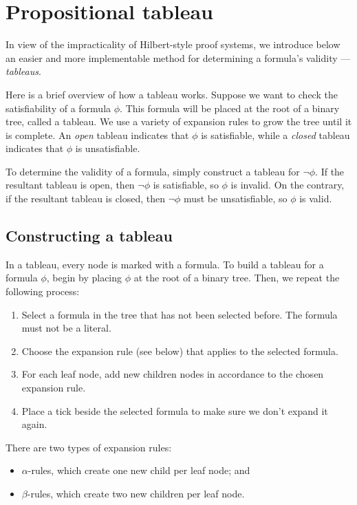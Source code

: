 \section{Propositional tableau}

In view of the impracticality of Hilbert-style proof systems, we introduce below an easier and more implementable method for determining a formula's validity --- \emph{tableaus}.

Here is a brief overview of how a tableau works. Suppose we want to check the satisfiability of a formula \(\phi\). This formula will be placed at the root of a binary tree, called a tableau. We use a variety of expansion rules to grow the tree until it is complete. An \emph{open} tableau indicates that \(\phi\) is satisfiable, while a \emph{closed} tableau indicates that \(\phi\) is unsatisfiable.

To determine the validity of a formula, simply construct a tableau for \(\neg\phi\). If the resultant tableau is open, then \(\neg\phi\) is satisfiable, so \(\phi\) is invalid. On the contrary, if the resultant tableau is closed, then \(\neg\phi\) must be unsatisfiable, so \(\phi\) is valid.


\subsection{Constructing a tableau}

In a tableau, every node is marked with a formula. To build a tableau for a formula \(\phi\), begin by placing \(\phi\) at the root of a binary tree. Then, we repeat the following process:
%
\begin{enumerate}
    \item Select a formula in the tree that has not been selected before. The formula must not be a literal.
    \item Choose the expansion rule (see below) that applies to the selected formula.
    \item For each leaf node, add new children nodes in accordance to the chosen expansion rule.
    \item Place a tick beside the selected formula to make sure we don't expand it again.
\end{enumerate}

There are two types of expansion rules:
%
\begin{itemize}
    \item \(\alpha\)-rules, which create one new child per leaf node; and
    \item \(\beta\)-rules, which create two new children per leaf node.
\end{itemize}

